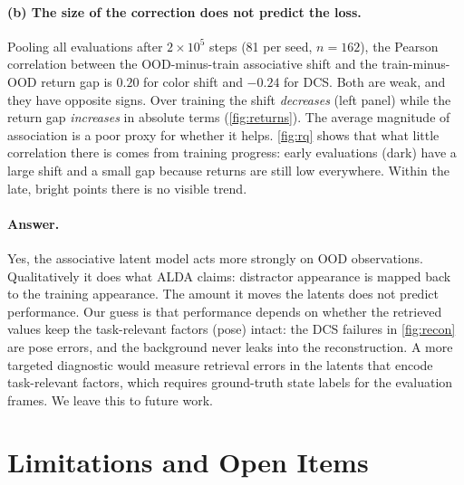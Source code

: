 \documentclass{article}
\theoremstyle{plain}
\theoremstyle{definition}
\theoremstyle{remark}
\begin{document}
\paragraph{(b) The size of the correction does not predict the loss.} Pooling
all evaluations after $2{\times}10^5$ steps (81 per seed, $n{=}162$), the
Pearson correlation between the OOD-minus-train associative shift and the
train-minus-OOD return gap is $0.20$ for color shift and $-0.24$ for DCS.
Both are weak, and they have opposite signs. Over training the shift
\emph{decreases} (left panel) while the return gap \emph{increases} in absolute
terms (\cref{fig:returns}). The average magnitude of association is a
poor proxy for whether it helps. \cref{fig:rq} shows that what little
correlation there is comes from training progress: early evaluations (dark)
have a large shift and a small gap because returns are still low
everywhere. Within the late, bright points there is no visible trend.

\paragraph{Answer.} Yes, the associative latent model acts more strongly on OOD
observations. Qualitatively it does what ALDA claims: distractor appearance is
mapped back to the training appearance. The amount it moves the latents does
not predict performance. Our guess is that performance depends on whether the
retrieved values keep the task-relevant factors (pose) intact: the DCS failures
in \cref{fig:recon} are pose errors, and the background never leaks into the
reconstruction. A more
targeted diagnostic would measure retrieval errors in the latents that
encode task-relevant factors, which requires ground-truth state labels for
the evaluation frames. We leave this to future work.

\section{Limitations and Open Items}
\label{sec:limits}
\end{document}
